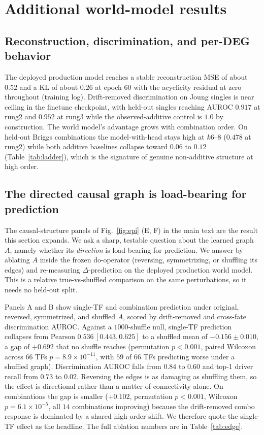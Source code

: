 \section{Additional world-model results}\label{app:wm}
\subsection{Reconstruction, discrimination, and per-DEG behavior}
The deployed production model reaches a stable reconstruction MSE of about $0.52$ and a KL
of about $0.26$ at epoch $60$ with the acyclicity residual at zero throughout (training
log). Drift-removed discrimination on Joung singles is near ceiling in the finetune
checkpoint, with held-out singles reaching AUROC $0.917$ at rung2 and $0.952$ at rung3 while
the observed-additive control is $1.0$ by construction. The world model's advantage grows
with combination order. On held-out Briggs combinations the model-with-head \PearsonDEG
stays high at $k6$--$8$ ($0.478$ at rung2) while both additive baselines collapse
toward $0.06$ to $0.12$ (Table~\ref{tab:ladder}), which is the signature of genuine
non-additive structure at high order.

\subsection{The directed causal graph is load-bearing for prediction}\label{app:causal_load}
The causal-structure panels of Fig.~\ref{fig:epi} (E, F) in the main text are the result this
section expands. We ask a sharp, testable question about the learned graph $A$, namely whether its
\emph{direction} is load-bearing for prediction. We answer by ablating $A$ inside the frozen do-operator
(reversing, symmetrizing, or shuffling its edges) and re-measuring $\Delta$-prediction on the
deployed production world model. This is a relative true-vs-shuffled comparison on
the same perturbations, so it needs no held-out split.

Panels A and B show single-TF and combination prediction under original, reversed,
symmetrized, and shuffled $A$, scored by drift-removed \PearsonDEG and cross-fate
discrimination AUROC. Against a $1000$-shuffle null, single-TF prediction collapses from
Pearson $0.536\,[0.443,0.625]$ to a shuffled mean of $-0.156\pm0.010$, a gap of $+0.692$ that
no shuffle reaches (permutation $p<0.001$, paired Wilcoxon across $66$ TFs
$p{=}8.9\times10^{-11}$, with $59$ of $66$ TFs predicting worse under a shuffled graph). Discrimination
AUROC falls from $0.84$ to $0.60$ and top-1 driver recall from $0.73$ to $0.02$. Reversing the
edges is as damaging as shuffling them, so the effect is directional rather than a matter of
connectivity alone. On combinations the gap is smaller ($+0.102$, permutation $p<0.001$,
Wilcoxon $p{=}6.1\times10^{-5}$, all $14$ combinations improving) because the drift-removed
combo response is dominated by a shared high-order shift. We therefore quote the single-TF
effect as the headline. The full ablation numbers are in Table~\ref{tab:edge}.

